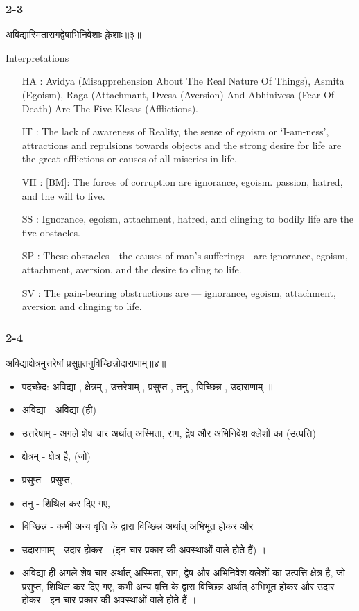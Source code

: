 \begin{frame}[fragile]\frametitle{2-3}
\begin{sanskrit}
अविद्यास्मितारागद्वेषाभिनिवेशाः क्लेशाः॥३॥
\end{sanskrit}

Interpretations
\begin{itemize}
\item [HA]: Avidya (Misapprehension About The Real Nature Of Things), Asmita (Egoism), Raga (Attachmant, Dvesa (Aversion) And Abhinivesa (Fear Of Death) Are The Five Klesas (Afflictions).
\item [IT]: The lack of awareness of Reality, the sense of egoism or ‘I-am-ness’, attractions and repulsions towards objects and the strong desire for life are the great afflictions or causes of all miseries in life.
\item [VH]: [BM]: The forces of corruption are ignorance, egoism. passion, hatred, and the will to live.
\item [SS]: Ignorance, egoism, attachment, hatred, and clinging to bodily life are the five obstacles.
\item [SP]: These obstacles—the causes of man’s sufferings—are ignorance, egoism, attachment, aversion, and the desire to cling to life.
\item [SV]: The pain-bearing obstructions are — ignorance, egoism, attachment, aversion and clinging to life. 
\end{itemize}
	
\end{frame}

\begin{frame}[fragile]\frametitle{2-4}
\begin{sanskrit}
अविद्याक्षेत्रमुत्तरेषां प्रसुप्ततनुविच्छिन्नोदाराणाम्॥४॥
\end{sanskrit}

	\begin{itemize}
	\item पदच्छेद: अविद्या , क्षेत्रम् , उत्तरेषाम् , प्रसुप्त , तनु , विच्छिन्न , उदाराणाम् ॥
	\item अविद्या - अविद्या (ही)
	\item उत्तरेषाम् - अगले शेष चार अर्थात् अस्मिता, राग, द्वेष और अभिनिवेश क्लेशों का (उत्पत्ति)
	\item क्षेत्रम् - क्षेत्र है, (जो)
	\item प्रसुप्त - प्रसुप्त,
	\item तनु - शिथिल कर दिए गए,
	\item विच्छिन्न - कभी अन्य वृत्ति के द्वारा विच्छिन्न अर्थात् अभिभूत होकर और
	\item उदाराणाम् - उदार होकर - (इन चार प्रकार की अवस्थाओं वाले होते हैं) ।	
	\item अविद्या ही अगले शेष चार अर्थात् अस्मिता, राग, द्वेष और अभिनिवेश क्लेशों का उत्पत्ति क्षेत्र है, जो प्रसुप्त, शिथिल कर दिए गए, कभी अन्य वृत्ति के द्वारा विच्छिन्न अर्थात् अभिभूत होकर और उदार होकर - इन चार प्रकार की अवस्थाओं वाले होते हैं ।
	\end{itemize}
	
\end{frame}


